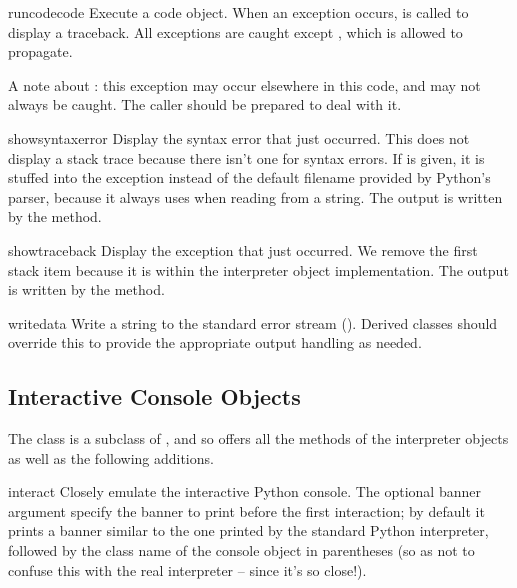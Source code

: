 \begin{methoddesc}[InteractiveInterpreter]{runcode}{code}
Execute a code object.
When an exception occurs,  is called to
display a traceback.  All exceptions are caught except
, which is allowed to propagate.

A note about : this exception may occur
elsewhere in this code, and may not always be caught.  The caller
should be prepared to deal with it.
\end{methoddesc}

\begin{methoddesc}[InteractiveInterpreter]{showsyntaxerror}{}
Display the syntax error that just occurred.  This does not display
a stack trace because there isn't one for syntax errors.
If  is given, it is stuffed into the exception instead
of the default filename provided by Python's parser, because it
always uses  when reading from a string.
The output is written by the  method.
\end{methoddesc}

\begin{methoddesc}[InteractiveInterpreter]{showtraceback}{}
Display the exception that just occurred.  We remove the first stack
item because it is within the interpreter object implementation.
The output is written by the  method.
\end{methoddesc}

\begin{methoddesc}[InteractiveInterpreter]{write}{data}
Write a string to the standard error stream ().
Derived classes should override this to provide the appropriate output
handling as needed.
\end{methoddesc}


\subsection{Interactive Console Objects
            \label{console-objects}}

The  class is a subclass of
, and so offers all the methods of the
interpreter objects as well as the following additions.

\begin{methoddesc}[InteractiveConsole]{interact}{}
Closely emulate the interactive Python console.
The optional banner argument specify the banner to print before the
first interaction; by default it prints a banner similar to the one
printed by the standard Python interpreter, followed by the class
name of the console object in parentheses (so as not to confuse this
with the real interpreter -- since it's so close!).
\end{methoddesc}

